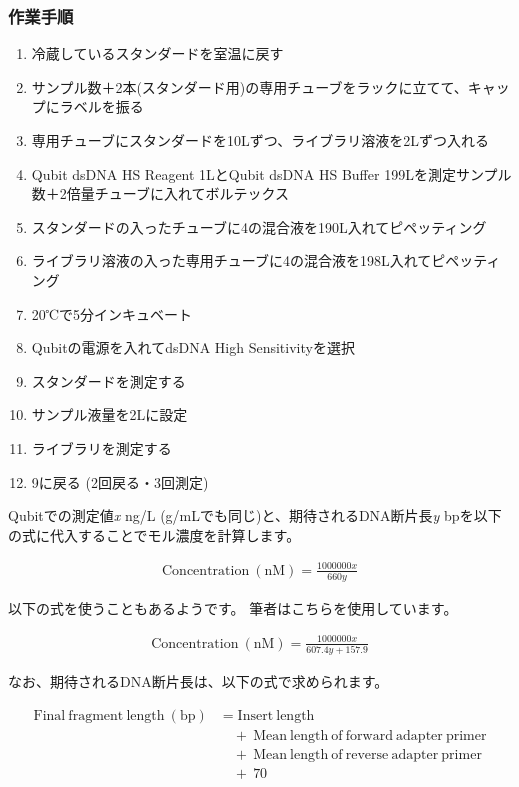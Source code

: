 \documentclass[titlepage,10pt,a4paper,uplatex]{jsbook}
\begin{document}
\subsubsection{作業手順}
\begin{enumerate}
\item 冷蔵しているスタンダードを室温に戻す
\item サンプル数＋2本(スタンダード用)の専用チューブをラックに立てて、キャップにラベルを振る
\item 専用チューブにスタンダードを10{\textmu}Lずつ、ライブラリ溶液を2{\textmu}Lずつ入れる
\item Qubit dsDNA HS Reagent 1{\textmu}LとQubit dsDNA HS Buffer 199{\textmu}Lを測定サンプル数＋2倍量チューブに入れてボルテックス
\item スタンダードの入ったチューブに4の混合液を190{\textmu}L入れてピペッティング
\item ライブラリ溶液の入った専用チューブに4の混合液を198{\textmu}L入れてピペッティング
\item 20℃で5分インキュベート
\item Qubitの電源を入れてdsDNA High Sensitivityを選択
\item スタンダードを測定する
\item サンプル液量を2{\textmu}Lに設定
\item ライブラリを測定する
\item 9に戻る (2回戻る・3回測定)
\end{enumerate}

Qubitでの測定値\textit{x} ng/{\textmu}L ({\textmu}g/mLでも同じ)と、期待されるDNA断片長\textit{y} bpを以下の式に代入することでモル濃度を計算します。

\begin{align*}
\mathrm{Concentration~(nM)} = \frac{1000000 x}{660 y}
\end{align*}

以下の式を使うこともあるようです。
筆者はこちらを使用しています。

\begin{align*}
\mathrm{Concentration~(nM)} = \frac{1000000 x}{607.4 y + 157.9}
\end{align*}

なお、期待されるDNA断片長は、以下の式で求められます。

\begin{align*}
\mathrm{Final~fragment~length~(bp)} &= \mathrm{Insert~length} \\
            &\quad + \ \mathrm{Mean~length~of~forward~adapter~primer} \\
            &\quad + \ \mathrm{Mean~length~of~reverse~adapter~primer} \\
            &\quad + \ 70
\end{align*}
\end{document}

